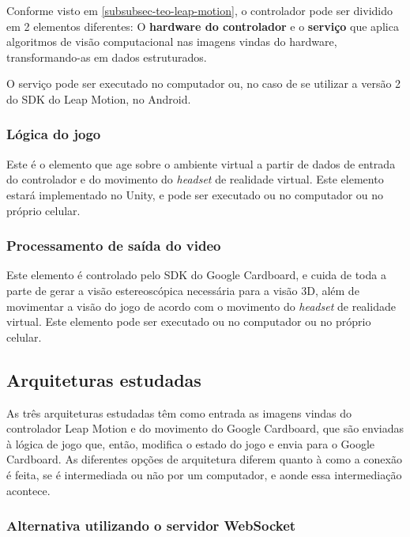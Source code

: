 Conforme visto em \ref{subsubsec-teo-leap-motion}, o controlador pode ser dividido em 2 elementos diferentes: O \textbf{hardware do controlador} e o \textbf{serviço} que aplica algoritmos de visão computacional nas imagens vindas do hardware, transformando-as em dados estruturados.

O serviço pode ser executado no computador ou, no caso de se utilizar a versão 2 do SDK do Leap Motion, no Android.

\subsubsection{Lógica do jogo}\label{subsubsec-elemento-logica-jogo}

Este é o elemento que age sobre o ambiente virtual a partir de dados de entrada do controlador e do movimento do \textit{headset} de realidade virtual. Este elemento estará implementado no Unity, e pode ser executado ou no computador ou no próprio celular.

\subsubsection{Processamento de saída do video}\label{subsubsec-elemento-video}

Este elemento é controlado pelo SDK do Google Cardboard, e cuida de toda a parte de gerar a visão estereoscópica necessária para a visão 3D, além de movimentar a visão do jogo de acordo com o movimento do \textit{headset} de realidade virtual. Este elemento pode ser executado ou no computador ou no próprio celular.

\subsection{Arquiteturas estudadas}\label{subsec-arquiteturas-estudadas}

As três arquiteturas estudadas têm como entrada as imagens vindas do controlador Leap Motion e do movimento do Google Cardboard, que são enviadas à lógica de jogo que, então, modifica o estado do jogo e envia para o Google Cardboard. As diferentes opções de arquitetura diferem quanto à como a conexão é feita, se é intermediada ou não por um computador, e aonde essa intermediação acontece.

\subsubsection{Alternativa utilizando o servidor WebSocket}\label{subsubsec-arquiteturas-leapmotion-pc-leapdata-android}

